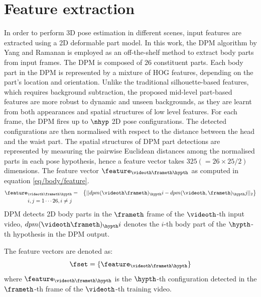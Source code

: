 \section{Feature extraction}

In order to perform 3D pose estimation in different scenes, input features are extracted using a 2D deformable part model.  
In this work, the DPM algorithm by Yang and Ramanan \cite{Yang2011} is employed as an off-the-shelf method to extract body parts from input frames. 
The DPM is composed of $26$ constituent parts. Each body part in the DPM is represented by a mixture of HOG features, depending on the part's location and orientation. 
Unlike the traditional silhouette-based features, which requires background subtraction, the proposed mid-level part-based features are more robust to dynamic and unseen backgrounds, as they are learnt from both appearances and spatial structures of low level features. 
For each frame, the DPM fires up to $\nhyp$ 2D pose configurations.  
The detected configurations are then normalised with respect to the distance between the head and the waist part. 
The spatial structures of DPM part detections are represented by measuring the pairwise Euclidean distances among the normalised parts in each pose hypothesis, hence a feature vector takes $325 (=26\times25/2)$ dimensions.
The feature vector $\feature_{\videoth\frameth\hypth}$ as computed in equation \ref{eq/body/feature}.
\begin{equation}
	\label{eq/body/feature} 
	\begin{aligned}
	\feature_{\videoth\frameth\hypth} & = & \left\{ || dpm(\videoth\frameth)_\hypth i - dpm(\videoth, \frameth)_\hypth j ||_{2} \right\} \\ 
		i, j = 1\cdots26, i \not= j
	\end{aligned}
\end{equation}
DPM detects 2D body parts in the $\frameth$ frame of the $\videoth$-th input video, $dpm(\videoth\frameth)_\hypth i$ denotes the $i$-th body part of the $\hypth$-th hypothesis in the DPM output.  

The feature vectors are denoted as: 
\begin{equation} 
	\fset = \{\feature_{\videoth\frameth\hypth}\}
\end{equation}
where $\feature_{\videoth\frameth\hypth}$ is the $\hypth$-th configuration detected in the $\frameth$-th frame of the $\videoth$-th training video. 

